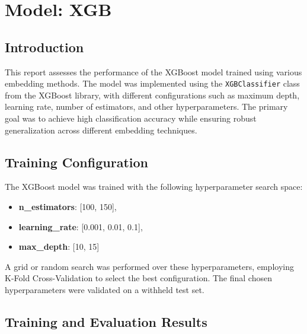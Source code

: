 \section{Model: XGB}

\subsection{Introduction}

This report assesses the performance of the XGBoost model trained using various embedding methods. The model was implemented using the \texttt{XGBClassifier} class from the XGBoost library, with different configurations such as maximum depth, learning rate, number of estimators, and other hyperparameters. The primary goal was to achieve high classification accuracy while ensuring robust generalization across different embedding techniques.

\subsection{Training Configuration}

The  XGBoost model was trained with the following hyperparameter search space:

\begin{itemize}
    \item \textbf{n\_estimators}:  [100, 150],
    \item \textbf{learning\_rate}: [0.001, 0.01, 0.1],
    \item \textbf{max\_depth}: [10, 15]
\end{itemize}



A grid or random search was performed over these hyperparameters, employing K-Fold Cross-Validation to select the best configuration. The final chosen hyperparameters were validated on a withheld test set.

\subsection{Training and Evaluation Results}

